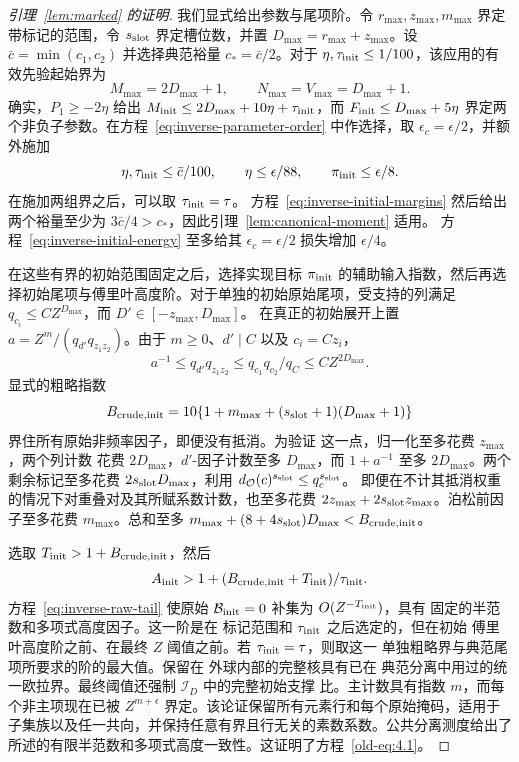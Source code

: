 \documentclass[11pt,a4paper]{article}
\numberwithin{equation}{section}
\numberwithin{figure}{section}
\theoremstyle{definition}
\theoremstyle{remark}
\begin{document}
\begin{proof}[引理~\ref{lem:marked} 的证明]
我们显式给出参数与尾项阶。令
\(r_{\max},z_{\max},m_{\max}\) 界定带标记的范围，令
\(s_{\rm slot}\) 界定槽位数，并置
\(D_{\max}=r_{\max}+z_{\max}\)。设
\(\bar c=\min(c_1,c_2)\) 并选择典范裕量
\(c_*=\bar c/2\)。对于 \(\eta,\tau_{\rm init}\le1/100\)，该应用的有效先验起始界为
\[
 M_{\max}=2D_{\max}+1,\qquad N_{\max}=V_{\max}=D_{\max}+1.
\]
确实，\(P_1\ge-2\eta\) 给出
\(M_{\rm init}\le2D_{\max}+10\eta+\tau_{\rm init}\)，而
\(F_{\rm init}\le D_{\max}+5\eta\) 界定两个非负子参数。在方程~\eqref{eq:inverse-parameter-order} 中作选择，取 \(\epsilon_c=\epsilon/2\)，并额外施加
\[
 \eta,\tau_{\rm init}\le\bar c/100,\qquad
 \eta\le\epsilon/88,\qquad \pi_{\rm init}\le\epsilon/8.
\]
在施加两组界之后，可以取 \(\tau_{\rm init}=\tau\)。
方程~\eqref{eq:inverse-initial-margins} 然后给出两个裕量至少为 \(3\bar c/4>c_*\)，因此引理~\ref{lem:canonical-moment} 适用。
方程~\eqref{eq:inverse-initial-energy} 至多给其 \(\epsilon_c=\epsilon/2\) 损失增加 \(\epsilon/4\)。

在这些有界的初始范围固定之后，选择实现目标 \(\pi_{\rm init}\) 的辅助输入指数，然后再选择初始尾项与傅里叶高度阶。对于单独的初始原始尾项，受支持的列满足
\(q_{c_i}\le C Z^{D_{\max}}\)，而 \(D'\in[-z_{\max},D_{\max}]\)。
在真正的初始展开上置
\(a=Z^m/(q_{d'}q_{z_1z_2})\)。由于 \(m\ge0\)、\(d'\mid C\) 以及
\(c_i=Cz_i\)，
\[
 a^{-1}\le q_{d'}q_{z_1z_2}
       \le q_{c_1}q_{c_2}/q_C\le C Z^{2D_{\max}}.
\]
显式的粗略指数
\[
 B_{\rm crude,init}=10\{1+m_{\max}+(s_{\rm slot}+1)(D_{\max}+1)\}
\]
界住所有原始非频率因子，即便没有抵消。为验证
这一点，归一化至多花费 \(z_{\max}\)，两个列计数
花费 \(2D_{\max}\)，\(d'\)-因子计数至多 \(D_{\max}\)，而
\(1+a^{-1}\) 至多 \(2D_{\max}\)。两个剩余标记至多花费
\(2s_{\rm slot}D_{\max}\)，利用 \(d_{\mathcal O}(c)^{s_{\rm slot}}\le q_c^{s_{\rm slot}}\)。
即便在不计其抵消权重的情况下对重叠对及其所赋系数计数，也至多花费
\(2z_{\max}+2s_{\rm slot}z_{\max}\)。泊松前因子至多花费
\(m_{\max}\)。总和至多
\(m_{\max}+(8+4s_{\rm slot})D_{\max}<B_{\rm crude,init}\)。

选取 \(T_{\rm init}>1+B_{\rm crude,init}\)，然后
\[
 A_{\rm init}>1+(B_{\rm crude,init}+T_{\rm init})/\tau_{\rm init}.
\]
方程~\eqref{eq:inverse-raw-tail} 使原始
\(\mathcal B_{\rm init}=0\) 补集为 \(O(Z^{-T_{\rm init}})\)，具有
固定的半范数和多项式高度因子。这一阶是在
标记范围和 \(\tau_{\rm init}\) 之后选定的，但在初始
傅里叶高度阶之前、在最终 \(Z\) 阈值之前。若
\(\tau_{\rm init}=\tau\)，则取这一
单独粗略界与典范尾项所要求的阶的最大值。保留在
外球内部的完整核具有已在
典范分离中用过的统一欧拉界。最终阈值还强制 \(\mathcal I_D\) 中的完整初始支撑
比。主计数具有指数 \(m\)，而每个非主项现在已被 \(Z^{m+\epsilon}\) 界定。该论证保留所有元素行和每个原始掩码，适用于子集族以及任一共向，并保持任意有界且行无关的素数系数。公共分离测度给出了所述的有限半范数和多项式高度一致性。这证明了方程~\eqref{old-eq:4.1}。
\end{proof}
\end{document}
